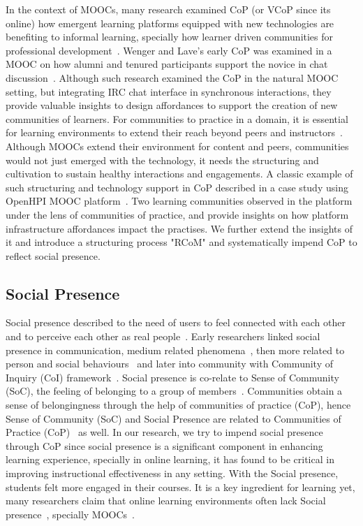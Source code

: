 \documentclass[format=acmsmall, review=false, screen=true]{acmart}
\begin{document}
In the context of MOOCs, many research examined CoP (or VCoP since its online) how emergent learning platforms equipped with new technologies are benefiting to informal learning, specially how learner driven communities for professional development~\cite{chae2018enhancing}. Wenger and Lave's early CoP was examined in a MOOC on how alumni and tenured participants support the novice in chat discussion~\cite{nelimarkka2015alumni}. Although such research examined the CoP in the natural MOOC setting, but integrating IRC chat interface in synchronous interactions, they provide valuable insights to design affordances to support the creation of new communities of learners. For communities to practice in a domain, it is essential for learning environments to extend their reach beyond peers and instructors~\cite{bruckman2002future}. Although MOOCs extend their environment for content and peers, communities would not just emerged with the technology, it needs the structuring and cultivation to sustain healthy interactions and engagements. A classic example of such structuring and technology support in CoP described in a case study using OpenHPI MOOC platform~\cite{grunewald2013openhpiF}. Two learning communities observed in the platform under the lens of communities of practice, and provide insights on how platform infrastructure affordances impact the practises. We further extend the insights of it and introduce a structuring process "RCoM" and systematically impend CoP to reflect social presence. 

\subsection{Social Presence}
Social presence described to the need of users to feel connected with each other and to perceive each other as real people~\cite{gunawardena1997social}. Early researchers linked social presence in communication, medium related phenomena~\cite{short1976social}, then more related to person and social behaviours~\cite{festinger1950social} and later into community with Community of Inquiry (CoI) framework~\cite{garrison2009communities}. Social presence is co-relate to Sense of Community (SoC), the feeling of belonging to a group of members~\cite{liu2009community}. Communities obtain a sense of belongingness through the help of communities of practice (CoP), hence Sense of Community (SoC) and Social Presence are related to Communities of Practice (CoP)~\cite{nistor2015sense} as well. In our research, we try to impend social presence through CoP since social presence is a significant component in enhancing learning experience, specially in online learning, it has found to be critical in improving instructional effectiveness in any setting. With the Social presence, students felt more engaged in their courses. It is a key ingredient for learning yet, many researchers claim that online learning environments often lack Social presence~\cite{kehrwald2008understanding,kim2011investigating}, specially MOOCs~\cite{poquet2018social,kovanovic2018exploring}. 
\end{document}
